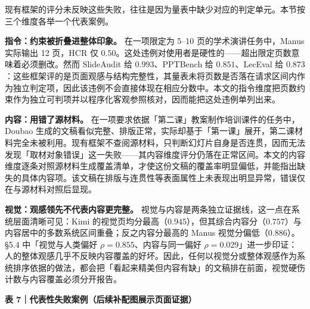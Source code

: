 现有框架的评分未反映这些失败，往往是因为量表中缺少对应的判定单元。本节按三个维度各举一个代表案例。

\textbf{指令：约束被折叠进整体印象。} 在一项限定为 5--10 页的学术演讲任务中，Manus 实际输出 12 页，HCR 仅 \(0.50\)。这处违例对使用者是硬性的------超出限定页数意味着必须删改。然而 SlideAudit 给 \(0.993\)、PPTBench 给 \(0.851\)、LecEval 给 \(0.873\)：这些框架评的是页面观感与结构完整性，其量表未将页数是否落在请求区间内作为独立判定项，因此该违例不会直接体现在相应分数中。本文的指令维度把页数约束作为独立可判项并以程序化客观参照核对，因而能把这处违例单列出来。

\textbf{内容：用错了源材料。} 在一项要求依据「第二课」教案制作培训课件的任务中，Doubao 生成的文稿看似完整、排版正常，实际却基于「第一课」展开，第二课材料完全未被利用。现有框架不查阅源材料，只判断幻灯片自身是否连贯，因而无法发现「取材对象错误」这一失败------其内容维度评分仍落在正常区间。本文的内容维度逐条对照源材料生成覆盖清单，才使这份文稿的覆盖率明显偏低，并能指出缺失的具体内容项。该文稿在排版与连贯性等表面属性上未表现出明显异常，错误仅在与源材料对照后显现。

\textbf{视觉：观感领先不代表内容更完整。} 视觉与内容是两条独立证据线，这一点在系统层面清晰可见：Kimi 的视觉页均分最高（\(0.945\)），但其综合内容分（\(0.757\)）与内容居中的多数系统区间重叠；反之内容分最高的 Manus 视觉分偏低（\(0.886\)）。§5.4 中「视觉与人类偏好 \(\rho{=}0.855\)、内容与同一偏好 \(\rho{=}0.029\)」进一步印证：人的整体观感几乎不反映内容覆盖的好坏。因此，任何以视觉分或整体观感作为系统排序依据的做法，都会把「看起来精美但内容有缺」的文稿排在前面，视觉硬伤计数与内容覆盖必须分开报告。

\textbf{表 7｜代表性失败案例（后续补配图展示页面证据）}

